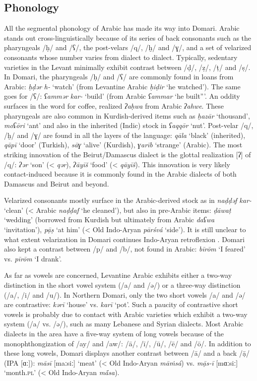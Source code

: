 \documentclass[output=paper]{langsci/langscibook}
\begin{document}
 
 \subsection{Phonology}


All the segmental phonology of Arabic has made its way into Domari. Arabic stands out cross-linguistically because of its series of back consonants such as the pharyngeals /ḥ/ and /ʕ/, the post-velars /q/, /ḫ/ and /ɣ/, and a set of velarized consonants whose number varies from dialect to dialect. Typically, sedentary varieties in the Levant minimally exhibit contrast between /ḍ/, /ẓ/, /ṭ/ and /ṣ/. In Domari, the pharyngeals /ḥ/ and /ʕ/ are commonly found in loans from Arabic: \textit{ḥḍər} \textit{h-} ‘watch’ (from Levantine Arabic \textit{ḥiḍir} ‘he watched’). The same goes for /ʕ/: \textit{ʕammər} \textit{kar-} `build' (from Arabic \textit{ʕammar} `he built”'. An oddity surfaces in the word for coffee, realized \textit{ʔaḥwa} from Arabic \textit{ʔahwe}. These pharyngeals are also common in Kurdish-derived items such as \textit{ḥazār} ‘thousand’, \textit{moʕōri} ‘ant’ and also in the inherited (Indic) stock in \textit{ʕaqqōr} ‘nut’. Post-velar /q/, /ḫ/ and /ɣ/ are found in all the layers of the language: \textit{qāla} ‘black’ (inherited), \textit{qāpī} ‘door’ (Turkish), \textit{sāɣ} ‘alive’ (Kurdish), \textit{ɣarīb} ‘strange’ (Arabic). The most striking innovation of the Beirut/Damascus dialect is the glottal realization [ʔ] of /q/: \textit{ʔər} ‘son’ (< \textit{qər}), \textit{ʔāyīš} ‘food’ (< \textit{qāyīš}). This innovation is very likely contact-induced because it is commonly found in the Arabic dialects of both Damascus and Beirut and beyond. 

Velarized consonants mostly surface in the Arabic-derived stock as in \textit{naḍḍəf} \textit{kar-} ‘clean’ (< Arabic \textit{naḍḍaf} ‘he cleaned’), but also in pre-Arabic items: \textit{ḍāwaṭ} ‘wedding’ (borrowed from Kurdish but ultimately from Arabic \textit{daʕwa} ‘invitation’), \textit{pạ̄ṣ} ‘at him’ (< Old Indo-Aryan \textit{pārśvá} ‘side’). It is still unclear to what extent velarization in Domari continues Indo-Aryan retroflexion \citep[64]{Matras2012}. Domari also kept a contrast between /p/ and /b/, not found in Arabic: \textit{bīrōm} ‘I feared’ vs. \textit{pīrōm} ‘I drank’. 

As far as vowels are concerned, Levantine Arabic exhibits either a two-way distinction in the short vowel system (/a/ and /ə/) or a three-way distinction (/a/, /i/ and /u/). In Northern Domari, only the two short vowels /a/ and /ə/ are contrastive: \textit{kərī} ‘house’ vs. \textit{karī} ‘pot’. Such a paucity of contrastive short vowels is probably due to contact with Arabic varieties which exhibit a two-way system (/a/ vs. /ə/), such as many Lebanese and Syrian dialects. Most Arabic dialects in the area have a five-way system of long vowels because of the monophthongization of /ay/ and /aw/: /ā/, /ī/, /ū/, /ē/ and /ō/. In addition to these long vowels, Domari displays another contrast between /ā/ and a back /ạ̄/ (IPA [ɑː]): \textit{māsī} [maːsiː] ‘meat’ (< Old Indo-Aryan \textit{māṁsá})  vs. \textit{mạ̄s-ī} [mɑːsiː] ‘month.\textsc{pl}’ (< Old Indo-Aryan \textit{mā́sa}).
\end{document}
